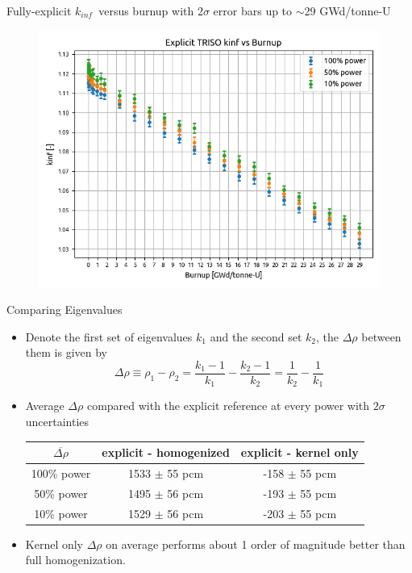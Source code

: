 \documentclass[9pt,t,aspectratio=169]{beamer}
\newcommand{\kinf}{$k_{inf}$}
\begin{document}
\begin{frame}{Fully-explicit \kinf~versus burnup with $2\sigma$ error bars up to $\sim$29 GWd/tonne-U}
    \begin{figure}
        \vspace*{-0.4cm}
        \centering
            \includegraphics[height=0.9\textheight]{figures/expl_kinf_vs_bu.png}
        \label{fig:kinf_full_explicit_results}
    \end{figure}
\end{frame}

\begin{frame}{Comparing Eigenvalues}
    \pause
    \Large
    \begin{itemize}
        \item<2-> Denote the first set of eigenvalues $k_ 1$ and the second set $k_2$, the $\Delta \rho$ between them is given by
        \begin{equation}
            \Delta \rho \equiv
            \rho_1 - \rho_2 =
            \frac{k_1-1}{k_1} - \frac{k_2 - 1 }{k_2} =
            \frac{1}{k_2} - \frac{1}{k_1}
        \end{equation}
        \item<3-> Average $\Delta \rho$ compared with the explicit reference at every power with $2\sigma$ uncertainties
        \begin{table}[!h]
            \centering
            \begin{tabular}{c|c|c}
            $\overline{\Delta \rho}$ & explicit - homogenized & explicit - kernel only \\ \hline
            100\% power & 1533 $\pm$ 55 pcm &  -158 $\pm$ 55 pcm \\
            50\% power & 1495 $\pm$ 56 pcm & -193 $\pm$ 55 pcm\\
            10\% power & 1529 $\pm$ 56 pcm  & -203 $\pm$ 55 pcm
            \end{tabular}
            \label{tab:average_pcms}
        \end{table}
    \item<4-> Kernel only $\Delta \rho$ on average performs about 1 order of magnitude better than full homogenization.
    \end{itemize}
    \normalsize
\end{frame}
\end{document}
